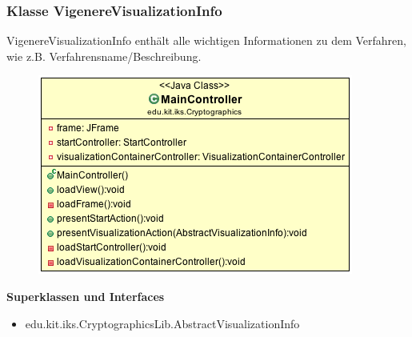 \documentclass{article}
\begin{document}
    \subsubsection{Klasse VigenereVisualizationInfo}
      VigenereVisualizationInfo enthält alle wichtigen Informationen zu dem Verfahren, wie z.B. Verfahrensname/Beschreibung.
      \begin{figure}[H]
        \centering
        \includegraphics[width=\textwidth]{resources/edu-kit-iks-Cryptographics-MainController}
      \end{figure}

      \textbf{Superklassen und Interfaces}
      \begin{itemize}
        \item edu.kit.iks.CryptographicsLib.AbstractVisualizationInfo
      \end{itemize}
      
\end{document}
